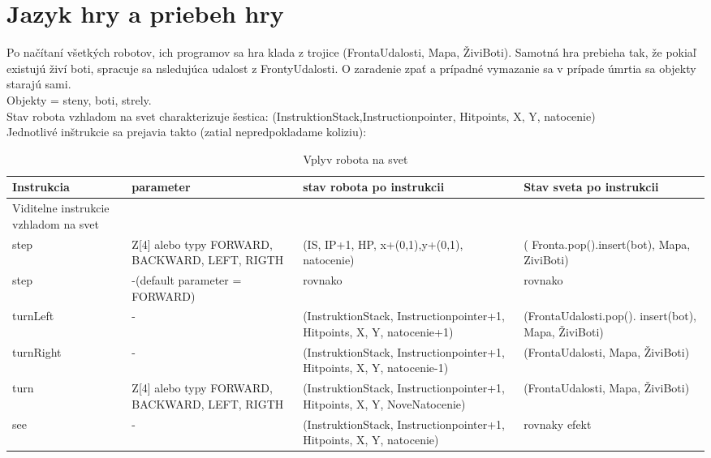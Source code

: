 \documentclass[a4paper,11pt,final]{report}
\begin{document}
\section{Jazyk hry a priebeh hry} %
Po načítaní všetkých robotov, ich programov sa hra klada z trojice (FrontaUdalosti, Mapa, ŽiviBoti). Samotná hra prebieha tak, že pokiaľ existujú živí boti, spracuje sa nsledujúca udalost z FrontyUdalosti. O zaradenie zpať a prípadné vymazanie sa v prípade úmrtia sa objekty starajú sami.\\
Objekty = steny, boti, strely. \\
Stav robota vzhladom na svet charakterizuje šestica: (InstruktionStack,Instructionpointer, Hitpoints, X, Y, natocenie)\\
Jednotlivé inštrukcie sa prejavia takto (zatial nepredpokladame koliziu):
\begin{table}[ht]
\caption{Vplyv robota na svet}   %
\centering                          %
\begin{tabular}{|p{3cm}|p{3cm}|p{4cm}|p{4cm}|}        
\hline\hline                        %
Instrukcia & parameter & stav robota po instrukcii & Stav sveta po instrukcii\\    %
\hline                              %
Viditelne instrukcie vzhladom na svet\\\hline
step & Z[4] alebo typy FORWARD, BACKWARD, LEFT, RIGTH & (IS, IP+1, HP, x+(0,1),y+(0,1), natocenie) & ( Fronta.pop().insert(bot), Mapa, ZiviBoti)\\\hline
step & -(default parameter = FORWARD) & rovnako & rovnako\\\hline %
turnLeft & - & (InstruktionStack, Instructionpointer+1, Hitpoints, X, Y, natocenie+1)&(FrontaUdalosti.pop(). insert(bot), Mapa, ŽiviBoti)\\ \hline
turnRight  & - & (InstruktionStack, Instructionpointer+1, Hitpoints, X, Y, natocenie-1)&(FrontaUdalosti, Mapa, ŽiviBoti)\\\hline
turn  & Z[4] alebo typy FORWARD, BACKWARD, LEFT, RIGTH & (InstruktionStack, Instructionpointer+1, Hitpoints, X, Y, NoveNatocenie)&(FrontaUdalosti, Mapa, ŽiviBoti)\\\hline
see & - &  (InstruktionStack, Instructionpointer+1, Hitpoints, X, Y, natocenie) & rovnaky efekt\\\hline %

\end{tabular}
\end{table}
\end{document}
